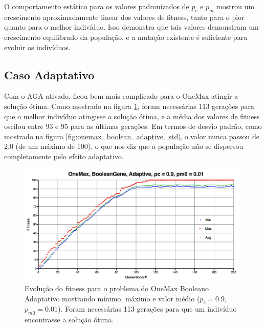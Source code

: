 O comportamento estático para os valores padronizados de $p_c$ e $p_m$ mostrou um crescimento aproximadamente linear dos valores de fitness, tanto para o pior quanto para o melhor indivíduo. Isso demonstra que tais valores demonstram um crescimento equilibrado da população, e a mutação existente é suficiente para evoluir os indivíduos.

\subsection{Caso Adaptativo}

Com o AGA ativado, ficou bem mais complicado para o OneMax atingir a solução ótima. Como mostrado na figura \ref{fig:onemax_boolean_adaptive}, foram necessárias 113 gerações para que o melhor indivíduo atingisse a solução ótima, e a média dos valores de fitness oscilou entre 93 e 95 para as últimas gerações. Em termos de desvio padrão, como mostrado na figura \ref{fig:onemax_boolean_adaptive_std}, o valor nunca passou de 2.0 (de um máximo de 100), o que nos diz que a população não se dispersou completamente pelo efeito adaptativo.

\begin{figure}[ht!]
    \centering \includegraphics[width=1.0\textwidth]{onemax_boolean_adaptive.jpg}
    \caption{Evolução do fitness para o problema do OneMax Booleano Adaptativo mostrando mínimo, máximo e valor médio ($p_c=0.9$, $p_{m0}=0.01$). Foram necessárias 113 gerações para que um indivíduo encontrasse a solução ótima.}
    \label{fig:onemax_boolean_adaptive}
\end{figure}

